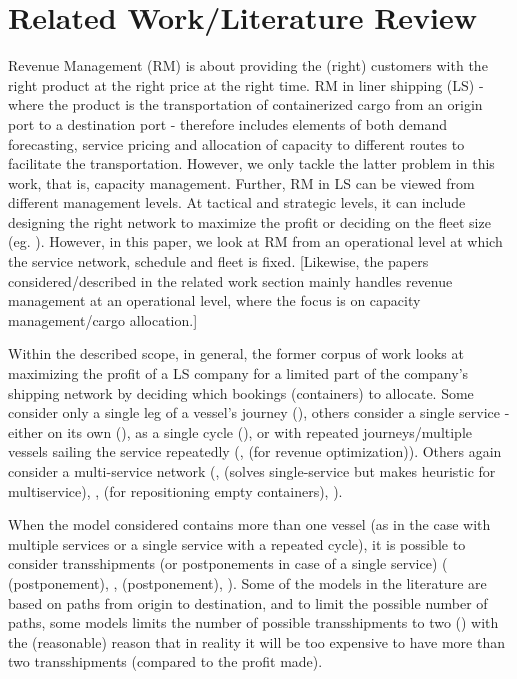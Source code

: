 \section{Related Work/Literature Review}
\label{sec:relatedwork}
Revenue Management (RM) is about providing the (right) customers with the right product at the right price at the right time. RM in liner shipping (LS) - where the product is the transportation of containerized cargo from an origin port to a destination port - therefore includes elements of both demand forecasting, service pricing and allocation of capacity to different routes to facilitate the transportation. However, we only tackle the latter problem in this work, that is, capacity management. Further, RM in LS can be viewed from different management levels. At tactical and strategic levels, it can include designing the right network to maximize the profit or deciding on the fleet size (eg. \citet{Ting04,Song12}). However, in this paper, we look at RM from an operational level at which the service network, schedule and fleet is fixed. [Likewise, the papers considered/described in the related work section mainly handles revenue management at an operational level, where the focus is on capacity management/cargo allocation.]

Within the described scope, in general, the former corpus of work looks at maximizing the profit of a LS company for a limited part of the company’s shipping network by deciding which bookings (containers) to allocate. Some consider only a single leg of a vessel’s journey (\citet{Lee07,Bingzhou08}), others consider a single service - either on its own (\citet{Maragos94,Ting04}), as a single cycle (\citet{Feng08,Feng07,Wang19a}), or with repeated journeys/multiple vessels sailing the service repeatedly (\citet{Zou08,Lu10}, \citet{Chang15} (for revenue optimization)). Others again consider a multi-service network (\citet{Zurheide15}, \citet{Demirag07} (solves single-service but makes heuristic for multiservice), \citet{Xianzhi07, Zurheide12, Wang15b}, \citet{Chang15} (for repositioning empty containers), \citet{Song12}).

When the model considered contains more than one vessel (as in the case with multiple services or a single service with a repeated cycle), it is possible to consider transshipments (or postponements in case of a single service) (\citet{Lee07} (postponement), \citet{Zurheide15, Zhen17}, \citet{Wang19b} (postponement), \citet{Xianzhi07, Zurheide12, Wang15b, Song12}). Some of the models in the literature are based on paths from origin to destination, and to limit the possible number of paths, some models limits the number of possible transshipments to two (\citet{Zurheide12, Zurheide15, Song12}) with the (reasonable) reason that in reality it will be too expensive to have more than two transshipments (compared to the profit made).

